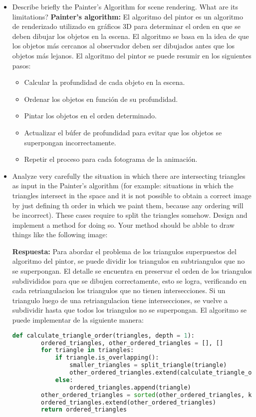 \documentclass{article}
\begin{document}
\begin{itemize}
    \item Describe briefly the Painter's Algorithm for scene rendering. What are its limitations?
    \textbf{Painter's algorithm:} El algoritmo del pintor es un algoritmo de renderizado utilizado en gráficos 3D para determinar el orden en que se deben dibujar los objetos en la escena. El algoritmo se basa en la idea de que los objetos más cercanos al observador deben ser dibujados antes que los objetos más lejanos. El algoritmo del pintor se puede resumir en los siguientes pasos:

    \begin{itemize}
        \item Calcular la profundidad de cada objeto en la escena.
        \item Ordenar los objetos en función de su profundidad.
        \item Pintar los objetos en el orden determinado.
        \item Actualizar el búfer de profundidad para evitar que los objetos se superpongan incorrectamente.
        \item Repetir el proceso para cada fotograma de la animación.
    \end{itemize}

    \item Analyze very carefully the situation in which there are intersecting triangles as input in the Painter's algorithm (for example: situations in which the triangles intersect in the space and it is not possible to obtain a correct image by just defining th order in which we paint them, because any ordering will be incorrect). These cases require to split the triangles somehow. Design and implement a method for doing so. Your method should be abble to draw things like the following image:
    
    \textbf{Respuesta:}
    Para abordar el problema de los triangulos superpuestos del algoritmo del pintor, se puede dividir los triangulos en subtriangulos que no se superpongan. El detalle se encuentra en preservar el orden de los triangulos subdivididos para que se dibujen correctamente, esto se logra, verificando en cada retriangulacion los triangulos que no tienen intersecciones. Si un triangulo luego de una retriangulacion tiene intersecciones, se vuelve a subdividir hasta que todos los triangulos no se superpongan. El algoritmo se puede implementar de la siguiente manera:
    
    \begin{lstlisting}[language=Python]
    def calculate_triangle_order(triangles, depth = 1):
        ordered_triangles, other_ordered_triangles = [], []
        for triangle in triangles:
            if triangle.is_overlapping():
                smaller_triangles = split_triangle(triangle)
                other_ordered_triangles.extend(calculate_triangle_order(smaller_triangles, depth + 1))
            else:
                ordered_triangles.append(triangle)
        other_ordered_triangles = sorted(other_ordered_triangles, key=lambda t: t.depth, t.area)
        ordered_triangles.extend(other_ordered_triangles)
        return ordered_triangles
    \end{lstlisting}


\end{itemize}
\end{document}
